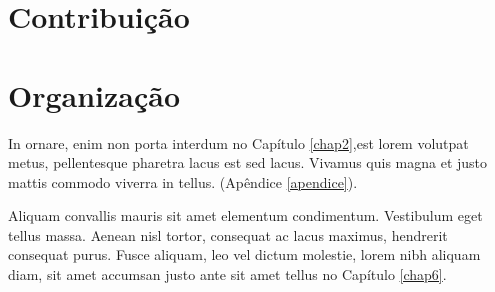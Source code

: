 \section{Contribuição}

\section{Organização}

In ornare, enim non porta interdum no Capítulo \ref{chap2},est lorem volutpat metus, pellentesque pharetra lacus est sed lacus. Vivamus quis magna et justo mattis commodo viverra in tellus. (Apêndice \ref{apendice}).

Aliquam convallis mauris sit amet elementum condimentum. Vestibulum eget tellus massa. Aenean nisl tortor, consequat ac lacus maximus, hendrerit consequat purus. Fusce aliquam, leo vel dictum molestie, lorem nibh aliquam diam, sit amet accumsan justo ante sit amet tellus no Capítulo \ref{chap6}.